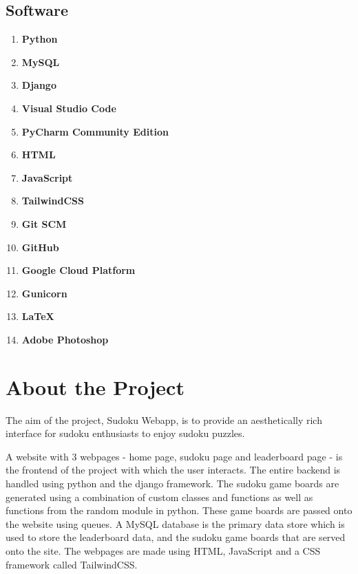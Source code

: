 \documentclass[12pt, a4paper]{report}
\begin{document}
    \subsection{Software}
    \begin{enumerate}
        \item \textbf{Python} \newline
        \item \textbf{MySQL} \newline
        \item \textbf{Django} \newline
        \item \textbf{Visual Studio Code} \newline
        \item \textbf{PyCharm Community Edition} \newline
        \item \textbf{HTML} \newline
        \item \textbf{JavaScript} \newline
        \item \textbf{TailwindCSS} \newline
        \item \textbf{Git SCM} \newline
        \item \textbf{GitHub} \newline
        \item \textbf{Google Cloud Platform} \newline
        \item \textbf{Gunicorn} \newline
        \item \textbf{\LaTeX} \newline
        \item \textbf{Adobe Photoshop} \newline
        
    \end{enumerate}
    
    
  \newpage
  \section{About the Project}
  The aim of the project, Sudoku Webapp, is to provide an aesthetically rich interface for sudoku enthusiasts to enjoy sudoku puzzles.\newline

  A website with 3 webpages - home page, sudoku page and leaderboard page - is the frontend of the project with which the user interacts. The entire backend is handled using python and the django framework. The sudoku game boards are generated using a combination of custom classes and functions as well as functions from the random module in python. These game boards are passed onto the website using queues. A MySQL database is the primary data store which is used to store the leaderboard data, and the sudoku game boards that are served onto the site. The webpages are made using HTML, JavaScript and a CSS framework called TailwindCSS. \newline
\end{document}
